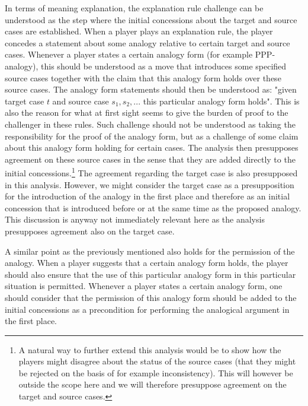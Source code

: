 		In terms of meaning explanation, the explanation rule challenge can be understood as the step where the initial concessions about the target and source cases are established. When a player plays an explanation rule, the player concedes a statement about some analogy relative to certain target and source cases. Whenever a player states a certain analogy form (for example PPP-analogy), this should be understood as a move that introduces some specified source cases together with the claim that this analogy form holds over these source cases. The analogy form statements should then be understood as: "given target case $t$ and source case $s_1, s_2, ...$ this particular analogy form holds". This is also the reason for what at first sight seems to give the burden of proof to the challenger in these rules. Such challenge should not be understood as taking the responsibility for the proof of the analogy form, but as a challenge of some claim about this analogy form holding for certain cases. The analysis then presupposes agreement on these source cases in the sense that they are added directly to the initial concessions.\footnote{A natural way to further extend this analysis would be to show how the players might disagree about the status of the source cases (that they might be rejected on the basis of for example inconsistency). This will however be outside the scope here and we will therefore presuppose agreement on the target and source cases.} The agreement regarding the target case is also presupposed in this analysis. However, we might consider the target case as a presupposition for the introduction of the analogy in the first place and therefore as an initial concession that is introduced before or at the same time as the proposed analogy. This discussion is anyway not immediately relevant here as the analysis presupposes agreement also on the target case. 
		
		A similar point as the previously mentioned also holds for the permission of the analogy. When a player suggests that a certain analogy form holds, the player should also ensure that the use of this particular analogy form in this particular situation is permitted. Whenever a player states a certain analogy form, one should consider that the permission of this analogy form should be added to the initial concessions as a precondition for performing the analogical argument in the first place. 
		
